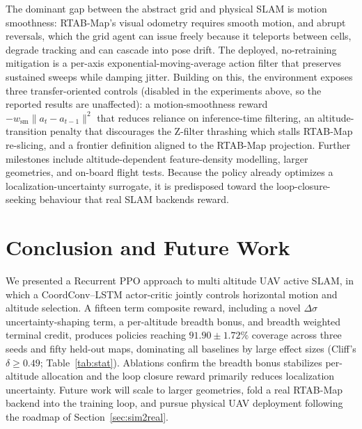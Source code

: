 \documentclass[runningheads]{llncs}
\begin{document}
The dominant gap between the abstract grid and physical SLAM is motion smoothness: RTAB-Map's visual odometry requires smooth motion, and abrupt reversals, which the grid agent can issue freely because it teleports between cells, degrade tracking and can cascade into pose drift. The deployed, no-retraining mitigation is a per-axis exponential-moving-average action filter that preserves sustained sweeps while damping jitter. Building on this, the environment exposes three transfer-oriented controls (disabled in the experiments above, so the reported results are unaffected): a motion-smoothness reward $-w_{\text{sm}}\|a_t-a_{t-1}\|^2$ that reduces reliance on inference-time filtering, an altitude-transition penalty that discourages the Z-filter thrashing which stalls RTAB-Map re-slicing, and a frontier definition aligned to the RTAB-Map projection. Further milestones include altitude-dependent feature-density modelling, larger geometries, and on-board flight tests. Because the policy already optimizes a localization-uncertainty surrogate, it is predisposed toward the loop-closure-seeking behaviour that real SLAM backends reward.

\section{Conclusion and Future Work}
We presented a Recurrent PPO approach to multi altitude UAV active SLAM, in which a CoordConv--LSTM actor-critic jointly controls horizontal motion and altitude selection. A fifteen term composite reward, including a novel $\Delta\sigma$ uncertainty-shaping term, a per-altitude breadth bonus, and breadth weighted terminal credit, produces policies reaching $91.90\!\pm\!1.72\%$ coverage across three seeds and fifty held-out maps, dominating all baselines by large effect sizes (Cliff's $\delta\!\geq\!0.49$; Table~\ref{tab:stat}). Ablations confirm the breadth bonus stabilizes per-altitude allocation and the loop closure reward primarily reduces localization uncertainty. Future work will scale to larger geometries, fold a real RTAB-Map backend into the training loop, and pursue physical UAV deployment following the roadmap of Section~\ref{sec:sim2real}.
\end{document}
